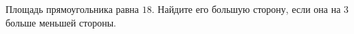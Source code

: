 \begin{ex}
	\begin{condition}
		 Площадь прямоугольника равна \( 18 \). Найдите его большую сторону, если она на \( 3 \) больше меньшей стороны.
	\end{condition}
\end{ex}